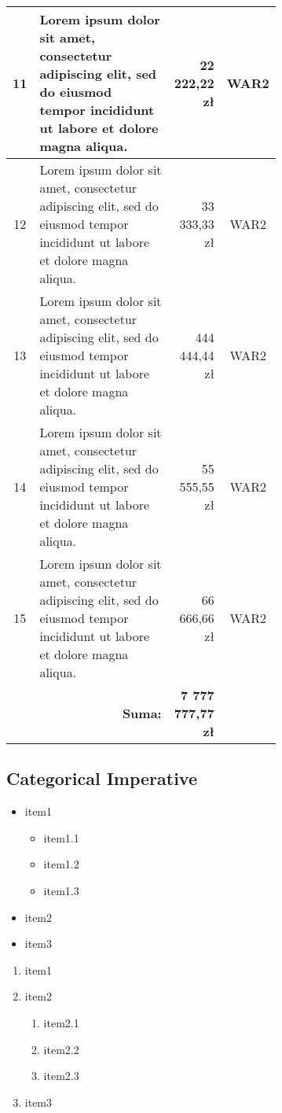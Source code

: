 \begin{longtable}{| c | m{0.58\linewidth} | r | m{0.1\linewidth} |}
	11 & Lorem ipsum dolor sit amet, consectetur adipiscing elit, sed do eiusmod tempor incididunt ut labore et dolore magna aliqua. & 22 222,22 zł & \multicolumn{1}{c|}{WAR2} \\ \hline
	12 & Lorem ipsum dolor sit amet, consectetur adipiscing elit, sed do eiusmod tempor incididunt ut labore et dolore magna aliqua. & 33 333,33 zł & \multicolumn{1}{c|}{WAR2} \\ \hline
	13 & Lorem ipsum dolor sit amet, consectetur adipiscing elit, sed do eiusmod tempor incididunt ut labore et dolore magna aliqua. & 444 444,44 zł & \multicolumn{1}{c|}{WAR2} \\ \hline
	14 & Lorem ipsum dolor sit amet, consectetur adipiscing elit, sed do eiusmod tempor incididunt ut labore et dolore magna aliqua. & 55 555,55 zł & \multicolumn{1}{c|}{WAR2} \\ \hline
	15 & Lorem ipsum dolor sit amet, consectetur adipiscing elit, sed do eiusmod tempor incididunt ut labore et dolore magna aliqua. & 66 666,66 zł & \multicolumn{1}{c|}{WAR2} \\ \hline
	& \multicolumn{1}{r|}{\textbf{Suma:}} & \textbf{7 777 777,77 zł} & 
	\label{table:koszty}
\end{longtable}
\kant[4]

\subsection{Categorical Imperative}
\kant[6]
\begin{itemize}
	\item item1
	\begin{itemize}
		\item item1.1
		\item item1.2
		\item item1.3
	\end{itemize}
	\item item2
	\item item3
\end{itemize}
\kant[7]
\begin{enumerate}
	\item item1
	\item item2
	\begin{enumerate}
		\item item2.1
		\item item2.2
		\item item2.3
	\end{enumerate}
	\item item3
\end{enumerate}
\kant[8]

